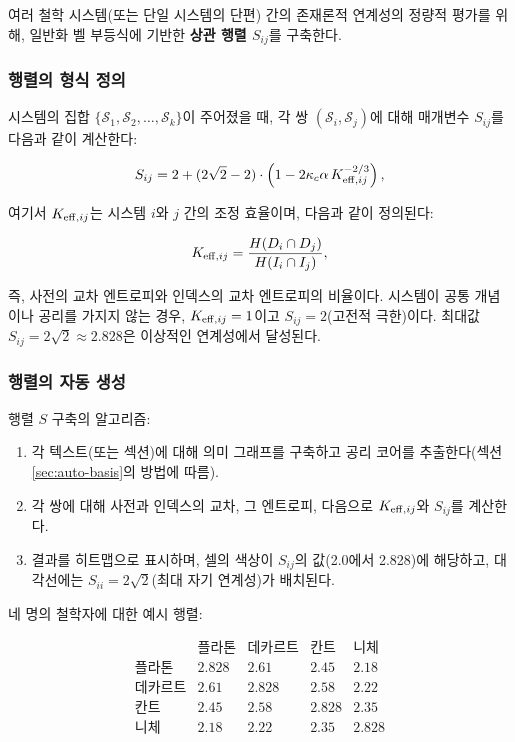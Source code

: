 \documentclass[11pt,a4paper]{article}
\newcommand{\kappac}{\kappa_c}
\begin{document}
	여러 철학 시스템(또는 단일 시스템의 단편) 간의 존재론적 연계성의 정량적 평가를 위해, 일반화 벨 부등식에 기반한 \textbf{상관 행렬 \(S_{ij}\)}를 구축한다.
	
	\subsubsection{행렬의 형식 정의}
	
	시스템의 집합 \(\{\mathcal{S}_1, \mathcal{S}_2, \dots, \mathcal{S}_k\}\)이 주어졌을 때, 각 쌍 \((\mathcal{S}_i, \mathcal{S}_j)\)에 대해 매개변수 \(S_{ij}\)를 다음과 같이 계산한다:
	
	\[
	S_{ij} = 2 + (2\sqrt{2} - 2) \cdot \left(1 - 2\kappac \alpha \, \Keff[ij]^{-2/3}\right),
	\]
	
	여기서 \(\Keff[ij]\)는 시스템 \(i\)와 \(j\) 간의 조정 효율이며, 다음과 같이 정의된다:
	
	\[
	\Keff[ij] = \frac{H(D_i \cap D_j)}{H(I_i \cap I_j)},
	\]
	
	즉, 사전의 교차 엔트로피와 인덱스의 교차 엔트로피의 비율이다. 시스템이 공통 개념이나 공리를 가지지 않는 경우, \(\Keff[ij] = 1\)이고 \(S_{ij} = 2\)(고전적 극한)이다. 최대값 \(S_{ij} = 2\sqrt{2} \approx 2.828\)은 이상적인 연계성에서 달성된다.
	
	\subsubsection{행렬의 자동 생성}
	
	행렬 \(S\) 구축의 알고리즘:
	
	\begin{enumerate}
		\item 각 텍스트(또는 섹션)에 대해 의미 그래프를 구축하고 공리 코어를 추출한다(섹션 \ref{sec:auto-basis}의 방법에 따름).
		\item 각 쌍에 대해 사전과 인덱스의 교차, 그 엔트로피, 다음으로 \(\Keff[ij]\)와 \(S_{ij}\)를 계산한다.
		\item 결과를 히트맵으로 표시하며, 셀의 색상이 \(S_{ij}\)의 값(2.0에서 2.828)에 해당하고, 대각선에는 \(S_{ii} = 2\sqrt{2}\)(최대 자기 연계성)가 배치된다.
	\end{enumerate}
	
	네 명의 철학자에 대한 예시 행렬:
	
	\[
	\begin{array}{c|cccc}
		& \text{플라톤} & \text{데카르트} & \text{칸트} & \text{니체} \\
		\hline
		\text{플라톤} & 2.828 & 2.61 & 2.45 & 2.18 \\
		\text{데카르트} & 2.61 & 2.828 & 2.58 & 2.22 \\
		\text{칸트}   & 2.45 & 2.58 & 2.828 & 2.35 \\
		\text{니체}  & 2.18 & 2.22 & 2.35 & 2.828 \\
	\end{array}
	\]
	
\end{document}
